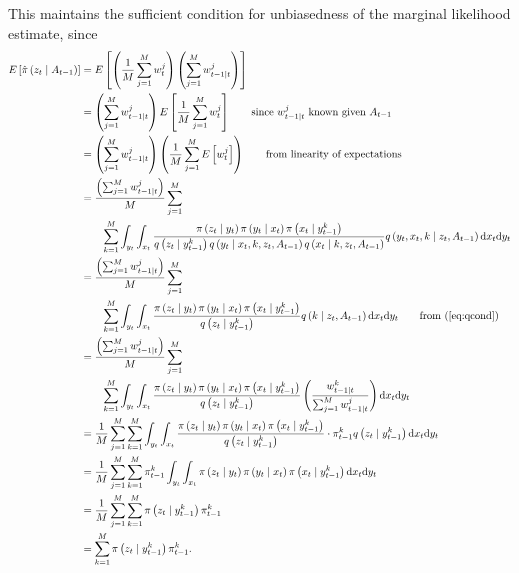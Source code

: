 \documentclass[a4paper]{article}
\begin{document}
This maintains the sufficient condition for unbiasedness of the marginal likelihood estimate, since
\begin{align*}
    E\left[\hat{\pi}\left(z_t \mid A_{t - 1}\right)\right] &= E\left[\left(\frac{1}{M}\sum_{j = 1}^M w^j_t\right)\left(\sum_{j = 1}^M w^j_{t - 1 \mid t}\right)\right]\\
    &= \left(\sum_{j = 1}^M w^j_{t - 1 \mid t}\right)E\left[\frac{1}{M}\sum_{j = 1}^M w^j_t\right] \qquad \mbox{since $w^j_{t - 1 \mid t}$ known given $A_{t - 1}$}\\
    &= \left(\sum_{j = 1}^M w^j_{t - 1 \mid t}\right)\left(\frac{1}{M}\sum_{j = 1}^M E\left[w^j_t\right]\right) \qquad \mbox{from linearity of expectations}\\
    &= \frac{\left(\sum_{j = 1}^M w^j_{t - 1 \mid t}\right)}{M}\sum_{j = 1}^M \\
    & \qquad \sum_{k = 1}^M\int_{y_t} \int_{x_t}  \frac{\pi\left(z_t \mid y_t\right)\pi\left(y_t \mid x_t\right)\pi\left(x_t \mid y^{k}_{t - 1}\right)}{q\left(z_t \mid y^{k}_{t - 1}\right)q\left(y_t \mid x_t, k, z_t, A_{t - 1}\right)q\left(x_t \mid k, z_t, A_{t - 1}\right)}q\left(y_t, x_t, k \mid z_t, A_{t - 1}\right)\mathrm{d}x_t\mathrm{d}y_t\\
    &= \frac{\left(\sum_{j = 1}^M w^j_{t - 1 \mid t}\right)}{M}\sum_{j = 1}^M \\
    & \qquad \sum_{k = 1}^M\int_{y_t} \int_{x_t}  \frac{\pi\left(z_t \mid y_t\right)\pi\left(y_t \mid x_t\right)\pi\left(x_t \mid y^{k}_{t - 1}\right)}{q\left(z_t \mid y^{k}_{t - 1}\right)}q\left(k \mid z_t, A_{t - 1}\right)\mathrm{d}x_t\mathrm{d}y_t \qquad \mbox{from (\ref{eq:qcond})}\\
    &= \frac{\left(\sum_{j = 1}^M w^j_{t - 1 \mid t}\right)}{M}\sum_{j = 1}^M \\
    & \qquad \sum_{k = 1}^M\int_{y_t} \int_{x_t}  \frac{\pi\left(z_t \mid y_t\right)\pi\left(y_t \mid x_t\right)\pi\left(x_t \mid y^{k}_{t - 1}\right)}{q\left(z_t \mid y^{k}_{t - 1}\right)}\left(\frac{w^k_{t - 1 \mid t}}{\sum_{j = 1}^M w^j_{t - 1 \mid t}}\right)\mathrm{d}x_t\mathrm{d}y_t\\
    &= \frac{1}{M}\sum_{j = 1}^M \sum_{k = 1}^M\int_{y_t} \int_{x_t}  \frac{\pi\left(z_t \mid y_t\right)\pi\left(y_t \mid x_t\right)\pi\left(x_t \mid y^{k}_{t - 1}\right)}{q\left(z_t \mid y^{k}_{t - 1}\right)}\cdot\pi^k_{t - 1} q\left(z_t \mid y^{k}_{t - 1}\right)\mathrm{d}x_t\mathrm{d}y_t\\
    &= \frac{1}{M}\sum_{j = 1}^M\sum_{k = 1}^M \pi^k_{t - 1} \int_{y_t} \int_{x_t} \pi\left(z_t \mid y_t\right)\pi\left(y_t \mid x_t\right)\pi\left(x_t \mid y^k_{t - 1}\right)\mathrm{d}x_t\mathrm{d}y_t\\
    &= \frac{1}{M}\sum_{j = 1}^M\sum_{k = 1}^M \pi\left(z_t \mid y^k_{t - 1}\right)\pi^k_{t - 1}\\
    &= \sum_{k = 1}^M \pi\left(z_t \mid y^k_{t - 1}\right)\pi^k_{t - 1}.
\end{align*}




\end{document}
